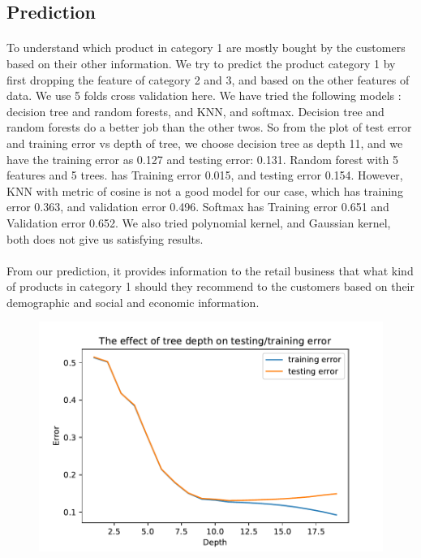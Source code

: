 \documentclass{article}
\begin{document}
\subsection{Prediction}
\paragraph{}
  To understand which product in category 1 are mostly bought by the customers based on their other information.
  We try to predict the product category 1 by  first dropping the feature of category 2 and 3, and based on the other features of data.  We use 5 folds cross validation here.  We have tried  the following models : decision tree and random forests, and KNN, and softmax. Decision tree and random forests do a better job than the other twos.
  So from the plot of test error and training error vs depth of tree, we choose decision tree as depth 11, and we have the training error as  0.127
  and testing error: 0.131.
  Random forest with 5 features and 5 trees.  has Training error 0.015, and testing error 0.154.  However, KNN with metric of cosine is not a good model for our case, which has training error 0.363, and validation error 0.496. 
  Softmax has Training error 0.651 and Validation error 0.652.  We also tried polynomial kernel, and Gaussian kernel, both does not give us satisfying results.  
  \paragraph{}From our prediction, it provides information to the retail business that what kind of products in category 1 should they recommend to the customers based on their demographic and social and economic information. 
\begin{figure}
\includegraphics[width=0.8\linewidth]{../figs/trainTest_category1.png}
\end{figure}
\end{document}
